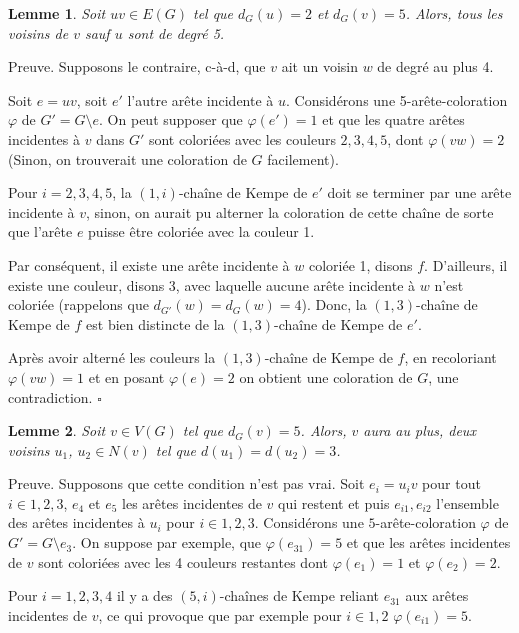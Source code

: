 \documentclass[10pt,a4paper]{article}
\newtheorem{lemme}{Lemme}
\newcommand{\ep}{{\hfill $\square$}}
\begin{document}
\begin{lemme}
Soit $uv \in E(G)$ tel que $d_G(u) = 2$ et $d_G(v) = 5$. Alors, tous les voisins de $v$ sauf $u$ sont de degré 5. 
\label{le:254}
\end{lemme}

Preuve. 
Supposons le contraire, c-à-d, que $v$ ait un voisin $w$ de degré au plus 4.

Soit $e=uv$, soit $e'$ l'autre arête incidente à $u$.
Considérons une 5-arête-coloration $\varphi$ de $G'=G \setminus e$. On peut supposer que $\varphi(e')=1$ et que les quatre arêtes incidentes à $v$ dans $G'$ sont coloriées avec les couleurs $2,3,4,5$, dont $\varphi(vw)=2$ (Sinon, on trouverait une coloration de $G$ facilement).

Pour $i=2,3,4,5$, la $(1,i)$-chaîne de Kempe de $e'$ doit se terminer par une arête incidente à $v$, sinon, on aurait pu alterner la coloration de cette chaîne de sorte que l'arête $e$ puisse être coloriée avec la couleur 1. 

Par conséquent, il existe une arête incidente à $w$ coloriée 1, disons $f$. D'ailleurs, il existe une couleur, disons 3, avec laquelle aucune arête incidente à $w$ n'est coloriée (rappelons que $d_{G'}(w)=d_G(w)=4$). Donc, la $(1,3)$-chaîne de Kempe de $f$ est bien distincte de la $(1,3)$-chaîne de Kempe de $e'$.

Après avoir alterné les couleurs la $(1,3)$-chaîne de Kempe de $f$, en recoloriant $\varphi(vw)=1$ et en posant $\varphi(e)=2$ on obtient une coloration de $G$, une contradiction. \ep

\begin{lemme}
Soit $v \in V(G)$ tel que $d_G(v) = 5$. Alors, $v$ aura au plus, deux voisins $u_1$, $u_2 \in N(v)$ tel que $d(u_1) = d(u_2) = 3$.
\label{le:5333}
\end{lemme}


Preuve.
Supposons que cette condition n'est pas vrai. Soit $e_i = u_iv$ pour tout $i \in {1,2,3}$, $e_4$ et $e_5$ les arêtes incidentes de $v$ qui restent et puis ${e_{i1}, e_{i2}}$ l'ensemble des arêtes incidentes à $u_i$ pour $i \in {1,2,3}$. Considérons une $5$-arête-coloration $\varphi$ de $G' = G \setminus e_3$. On suppose par exemple, que $\varphi(e_{31}) = 5$ et que les arêtes incidentes de $v$ sont coloriées avec les 4 couleurs restantes dont $\varphi(e_1)=1$ et $\varphi(e_2)=2$.

Pour $i = 1,2,3,4$ il y a des $(5,i)$-chaînes de Kempe reliant $e_{31}$ aux arêtes incidentes de $v$, ce qui provoque que par exemple pour $i \in {1,2}$ $\varphi(e_{i1}) = 5$.
\end{document}
